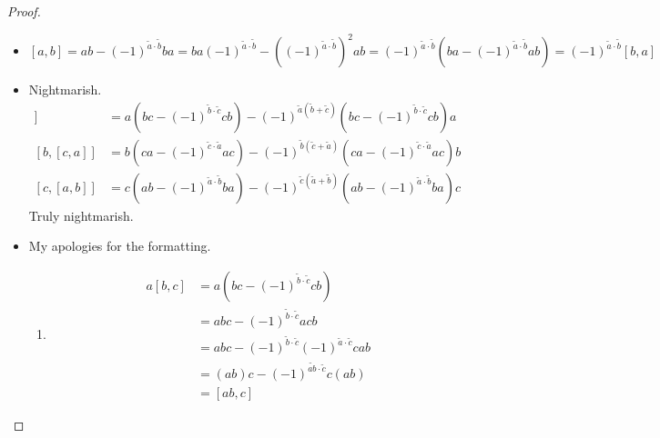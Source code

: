 \documentclass[a4paper,10pt]{scrreprt}
\theoremstyle{definition}
\theoremstyle{plain}
\theoremstyle{remark}
\begin{document}
\begin{proof}
  $\,$
  \begin{itemize}
    \item $[a,b] = ab-(-1)^{\tilde{a}\cdot \tilde{b}} ba = ba(-1)^{\tilde{a}\cdot \tilde{b}} - \left( (-1)^{\tilde{a}\cdot \tilde{b}} \right)^{2} ab = (-1)^{\tilde{a}\cdot \tilde{b}}\left( ba - (-1)^{\tilde{a}\cdot \tilde{b}}ab \right) = (-1)^{\tilde{a}\cdot \tilde{b}}[b,a] $
    \item Nightmarish.
      \begin{align*}
        [a,[b,c]] &= a(bc-(-1)^{\tilde{b}\cdot \tilde{c}}cb) - (-1)^{\tilde{a}(\tilde{b} + \tilde{c})}(bc-(-1)^{\tilde{b}\cdot \tilde{c}}cb)a \\
        [b,[c,a]] &= b(ca-(-1)^{\tilde{c}\cdot \tilde{a}}ac) - (-1)^{\tilde{b}(\tilde{c} + \tilde{a})}(ca-(-1)^{\tilde{c}\cdot \tilde{a}}ac)b \\
        [c,[a,b]] &= c(ab-(-1)^{\tilde{a}\cdot \tilde{b}}ba) - (-1)^{\tilde{c}(\tilde{a} + \tilde{b})}(ab-(-1)^{\tilde{a}\cdot \tilde{b}}ba)c 
      \end{align*}
      Truly nightmarish.

    \item My apologies for the formatting.
      \begin{enumerate}[label= Equality \arabic*:]
        \item 
          \begin{align*}
            a[b,c] &= a(bc-(-1)^{\tilde{b}\cdot \tilde{c}}cb) \\
            &= abc-(-1)^{\tilde{b}\cdot \tilde{c}}acb \\
            &= abc-(-1)^{\tilde{b}\cdot \tilde{c}} (-1)^{\tilde{a}\cdot \tilde{c}}cab\\
            &=(ab)c - (-1)^{\tilde{ab}\cdot \tilde{c}} c(ab) \\
            &= [ab,c]
          \end{align*}


\end{enumerate}
\end{itemize}
\end{proof}
\end{document}
